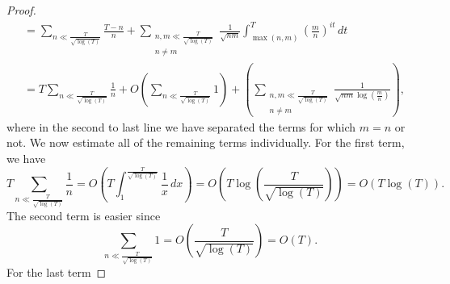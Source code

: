 \begin{proof}
\begin{align*}
        &= \sum_{n \ll \frac{T}{\sqrt{\log(T)}}}\frac{T-n}{n}+ \sum_{\substack{n,m \ll \frac{T}{\sqrt{\log(T)}} \\ n \neq m}}\frac{1}{\sqrt{nm}}\int_{\max(n,m)}^{T}\left(\frac{m}{n}\right)^{it}\,dt \\
        &= T\sum_{n \ll \frac{T}{\sqrt{\log(T)}}}\frac{1}{n}+O\left(\sum_{n \ll \frac{T}{\sqrt{\log(T)}}}1\right)+\left(\sum_{\substack{n,m \ll \frac{T}{\sqrt{\log(T)}} \\ n \neq m}}\frac{1}{\sqrt{nm}\log\left(\frac{m}{n}\right)}\right),
      \end{align*}
      where in the second to last line we have separated the terms for which $m = n$ or not. We now estimate all of the remaining terms individually. For the first term, we have
      \[
        T\sum_{n \ll \frac{T}{\sqrt{\log(T)}}}\frac{1}{n} = O\left(T\int_{1}^{\frac{T}{\sqrt{\log(T)}}}\frac{1}{x}\,dx\right) = O\left(T\log\left(\frac{T}{\sqrt{\log(T)}}\right)\right) = O(T\log(T)).
      \]
      The second term is easier since
      \[
        \sum_{n \ll \frac{T}{\sqrt{\log(T)}}}1 = O\left(\frac{T}{\sqrt{\log(T)}}\right) = O(T).
      \]
      For the last term 
    \end{proof}